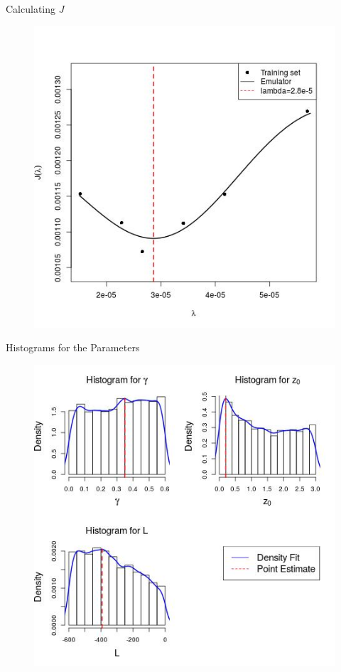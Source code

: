 \documentclass[11pt]{beamer}
\theoremstyle{plain}
\theoremstyle{definition}
\begin{document}
\begin{frame}{Calculating $J$}
\begin{figure}
\centering
\includegraphics[scale=0.35]{../FigChap4/lambdaEmul}
\end{figure}


\end{frame}

\begin{frame}{Histograms for the Parameters}

\begin{figure}
\centering
\includegraphics[scale=0.35]{./codes/histogramsI.jpg}
\end{figure}
\end{frame}
\end{document}
